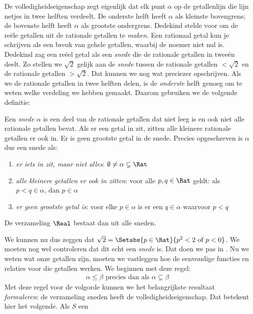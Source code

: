 \documentclass[../../../include/open-logic-section]{subfiles}
\begin{document}
De volledigheidseigenschap zegt eigenlijk dat elk punt $\alpha$ op de
getallenlijn die lijn netjes in twee helften verdeelt. De onderste
helft heeft $\alpha$ als kleinste bovengrens; de bovenste helft heeft
$\alpha$ als grootste ondergrens. Dedekind stelde voor om de reële
getallen uit de rationale getallen te \emph{maken}. Een rationaal getal
kun je schrijven als een breuk van gehele getallen, waarbij de noemer
niet nul is. Dedekind zag een
reëel getal als een \emph{snede} die de rationale getallen in tweeën
deelt. Zo stellen we $\sqrt{2}$ gelijk aan de \emph{snede} tussen de
rationale getallen $< \sqrt{2}$ en de rationale getallen $> \sqrt{2}$.
Dat kunnen we nog wat preciezer opschrijven. Als we de rationale getallen in twee
helften delen, is de \emph{onderste} helft genoeg om te weten welke
verdeling we hebben gemaakt. Daarom gebruiken we de volgende definitie:
\begin{defn}[Snede]
Een \emph{snede} $\alpha$ is een deel van de rationale getallen dat
niet leeg is en ook niet alle rationale getallen bevat. Als er een
getal in zit, zitten alle kleinere rationale getallen er ook in. Er is
geen grootste getal in de snede. Precies opgeschreven is $\alpha$ dus
een snede als:
\begin{enumerate}
	\item \emph{er iets in zit, maar niet alles}: $\emptyset \neq \alpha \subsetneq \Rat$
	\item \emph{alle kleinere getallen er ook in zitten}: voor alle $p,q \in \Rat$ geldt: als $p < q \in \alpha$, dan $p \in \alpha$
	\item \emph{er geen grootste getal is}: voor elke $p \in \alpha$ is er een $q \in \alpha$ waarvoor $p < q$
\end{enumerate}
De verzameling $\Real$ bestaat dan uit alle sneden.
\end{defn}
We kunnen nu dus zeggen dat $\sqrt{2} = \Setabs{p \in \Rat}{p^2 < 2\text{ of }p < 0}$. We moeten nog wel controleren dat dit echt een
\emph{snede} is. Dat doen we pas in .
Nu we weten wat onze getallen zijn, moeten we vastleggen hoe de
eenvoudige functies en relaties voor die getallen werken. We beginnen
met deze regel:
\begin{align*}
	\alpha \leq \beta \text{ precies dan als }\alpha \subseteq \beta
\end{align*}
Met deze regel voor de volgorde kunnen we het belangrijkste resultaat
\emph{formuleren}: de verzameling sneden heeft de
volledigheidseigenschap. Dat betekent hier het volgende. Als $S$ een
\end{document}
